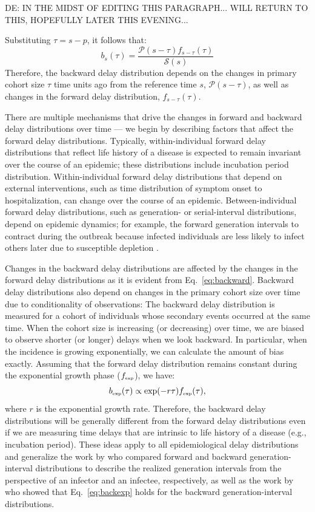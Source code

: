 \documentclass[12pt]{article}
\newcommand{\eref}[1]{Eq.~\ref{eq:#1}}
\newcommand{\tsub}[2]{#1_{{\textrm{\tiny #2}}}}
\newcommand{\pt}{p} %
\newcommand{\st}{s} %
\newcommand{\psize}{{\mathcal P}} %
\newcommand{\ssize}{{\mathcal S}} %
\begin{document}
{\color{red}DE: IN THE MIDST OF EDITING THIS PARAGRAPH... WILL RETURN
  TO THIS, HOPEFULLY LATER THIS EVENING...}

Substituting $\tau = \st - \pt$, it follows that:
\begin{equation}
b_\st(\tau) = \frac{\psize(\st-\tau) f_{\st-\tau}(\tau)}{\ssize(\st)}
\label{eq:backward}
\end{equation}
Therefore, the backward delay distribution depends on the changes in primary cohort size $\tau$ time units ago from the reference time $\st$, $\psize(\st-\tau)$, as well as changes in the forward delay distribution, $f_{\st-\tau}(\tau)$.

There are multiple mechanisms that drive the changes in forward and backward delay distributions over time ---
we begin by describing factors that affect the forward delay distributions.
Typically, within-individual forward delay distributions that reflect life history of a disease is expected to remain invariant over the course of an epidemic; 
these distributions include incubation period distribution.
Within-individual forward delay distributions that depend on external interventions, such as time distribution of symptom onset to hospitalization, can change over the course of an epidemic.
Between-individual forward delay distributions, such as generation- or serial-interval distributions, depend on epidemic dynamics;
for example, the forward generation intervals to contract during the outbreak because infected individuals are less likely to infect others later due to susceptible depletion \citep{champredon2015intrinsic}.

Changes in the backward delay distributions are affected by the changes in the forward delay distributions as it is evident from \eref{backward}.
Backward delay distributions also depend on changes in the primary cohort size over time due to conditionality of observations: 
The backward delay distribution is measured for a cohort of individuals whose secondary events occurred at the same time.
When the cohort size is increasing (or decreasing) over time, we are biased to observe shorter (or longer) delays when we look backward.
In particular, when the incidence is growing exponentially, we can calculate the amount of bias exactly.
Assuming that the forward delay distribution remains constant during the exponential growth phase ($\tsub{f}{exp}$), we have:
\begin{equation}
\tsub{b}{exp}(\tau) \propto \exp(-r\tau) \tsub{f}{exp}(\tau),
\label{eq:backexp}
\end{equation}
where $r$ is the exponential growth rate.
Therefore, the backward delay distributions will be generally different from the forward delay distributions even if we are measuring time delays that are intrinsic to life history of a disease (e.g., incubation period).
These ideas apply to all epidemiological delay distributions and generalize the work by \cite{champredon2015intrinsic} who compared forward and backward generation-interval distributions to describe the realized generation intervals from the perspective of an infector and an infectee, respectively, as well as the work by \cite{britton2019estimation} who showed that \eref{backexp} holds for the backward generation-interval distributions.
\end{document}
